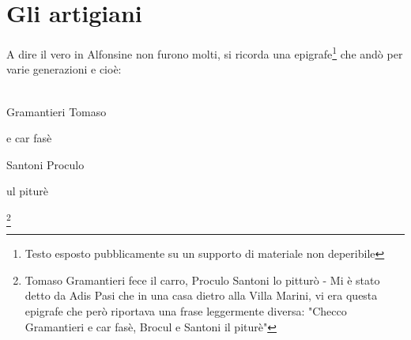 
\chapter{Gli artigiani}

A dire il vero in Alfonsine non furono molti, si ricorda una epigrafe\footnote{Testo esposto pubblicamente su un supporto di materiale non deperibile} che andò per varie generazioni e cioè:
\\\\
\textcal \Huge
	\centerline{Gramantieri Tomaso}
	\centerline{e car fasè}
	\centerline{Santoni Proculo}
	\centerline{ul piturè}\normalfont \normalsize \footnote{Tomaso Gramantieri fece il carro, Proculo Santoni lo pitturò - Mi è stato detto da Adis Pasi che in una casa dietro alla Villa Marini, vi era questa epigrafe che però riportava una frase leggermente diversa: "Checco Gramantieri e car fasè, Brocul e Santoni il piturè"}

